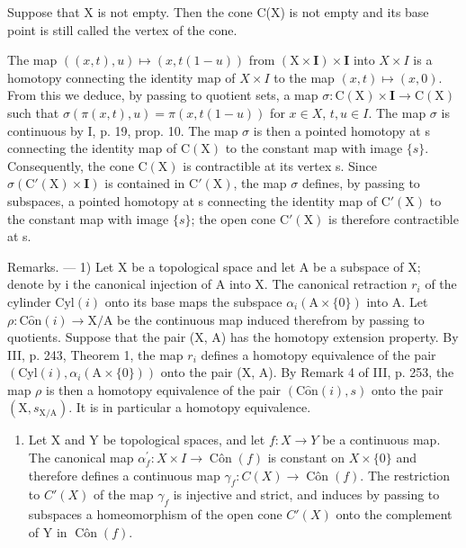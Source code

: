 Suppose that X is not empty. Then the cone C(X) is not empty and its base point is still called the vertex of the cone.

The map \(((x,t),u)\mapsto(x,t(1-u))\) from \((\mathrm{X}\times\mathbf{I})\times\mathbf{I}\) into \(X\times I\) is a homotopy connecting the identity map of \(X\times I\) to the map \((x,t)\mapsto(x,0)\). From this we deduce, by passing to quotient sets, a map \(\sigma\colon\mathrm{C}(\mathrm{X})\times\mathbf{I}\to\mathrm{C}(\mathrm{X})\) such that \(\sigma(\pi(x,t),u)=\pi(x,t(1-u))\) for \(x\in X\), \(t,u\in I\). The map \(\sigma\) is continuous by I, p. 19, prop. 10. The map \(\sigma\) is then a pointed homotopy at s connecting the identity map of \(\mathrm{C}(\mathrm{X})\) to the constant map with image \(\{s\}\). Consequently, the cone \(\mathrm{C}(\mathrm{X})\) is contractible at its vertex s. Since \(\sigma(\mathrm{C}'(\mathrm{X})\times\mathbf{I})\) is contained in \(\mathrm{C}'(\mathrm{X})\), the map \(\sigma\) defines, by passing to subspaces, a pointed homotopy at s connecting the identity map of \(\mathrm{C}'(\mathrm{X})\) to the constant map with image \(\{s\}\); the open cone \(\mathrm{C}'(\mathrm{X})\) is therefore contractible at s.

Remarks. --- 1) Let X be a topological space and let A be a subspace of X; denote by i the canonical injection of A into X. The canonical retraction \(r_{i}\) of the cylinder \(\mathrm{Cyl}(i)\) onto its base maps the subspace \(\alpha_{i}(\mathrm{A} \times \{0\})\) into A. Let \(\rho: \mathrm{C}\hat{\mathrm{o}}\mathrm{n}(i) \to \mathrm{X}/\mathrm{A}\) be the continuous map induced therefrom by passing to quotients. Suppose that the pair (X, A) has the homotopy extension property. By III, p. 243, Theorem 1, the map \(r_{i}\) defines a homotopy equivalence of the pair \((\mathrm{Cyl}(i), \alpha_{i}(\mathrm{A} \times \{0\}))\) onto the pair (X, A). By Remark 4 of III, p. 253, the map \(\rho\) is then a homotopy equivalence of the pair \((\mathrm{C}\hat{\mathrm{o}}\mathrm{n}(i), s)\) onto the pair \((\mathrm{X}, s_{\mathrm{X}/\mathrm{A}})\). It is in particular a homotopy equivalence.

\begin{enumerate}
\def\labelenumi{\arabic{enumi})}
\setcounter{enumi}{1}
\tightlist
\item
  Let X and Y be topological spaces, and let \(f\colon X \to Y\) be a continuous map. The canonical map \(\alpha_{f}^{\prime}\colon X \times I \to \operatorname{Côn}(f)\) is constant on \(X \times \{0\}\) and therefore defines a continuous map \(\gamma_{f}\colon C(X) \to \operatorname{Côn}(f)\). The restriction to \(C'(X)\) of the map \(\gamma_{f}\) is injective and strict, and induces by passing to subspaces a homeomorphism of the open cone \(C'(X)\) onto the complement of Y in \(\operatorname{Côn}(f)\).
\end{enumerate}

